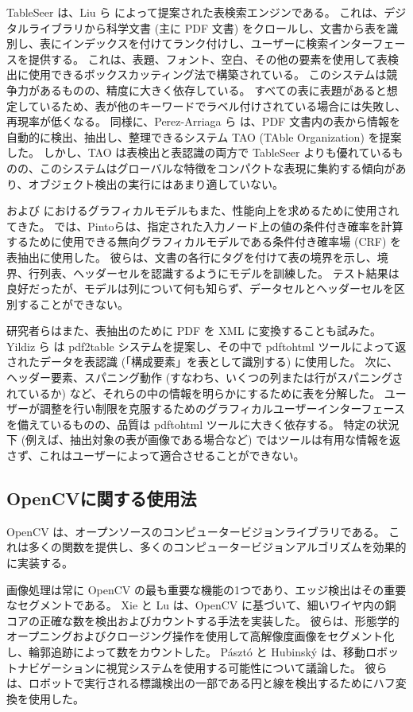 \documentclass[uplatex, twocolumn,10pt]{jsarticle}
\begin{document}
TableSeer は、Liu ら \cite{bib11} によって提案された表検索エンジンである。
これは、デジタルライブラリから科学文書 (主に PDF 文書) をクロールし、文書から表を識別し、表にインデックスを付けてランク付けし、ユーザーに検索インターフェースを提供する。
これは、表題、フォント、空白、その他の要素を使用して表検出に使用できるボックスカッティング法で構築されている。
このシステムは競争力があるものの、精度に大きく依存している。
すべての表に表題があると想定しているため、表が他のキーワードでラベル付けされている場合には失敗し、再現率が低くなる。
同様に、Perez-Arriaga ら \cite{bib12} は、PDF 文書内の表から情報を自動的に検出、抽出し、整理できるシステム TAO (TAble Organization) を提案した。
しかし、TAO は表検出と表認識の両方で TableSeer よりも優れているものの、このシステムはグローバルな特徴をコンパクトな表現に集約する傾向があり、オブジェクト検出の実行にはあまり適していない。

\cite{bib13} および \cite{bib14} におけるグラフィカルモデルもまた、性能向上を求めるために使用されてきた。
\cite{bib14} では、Pintoらは、指定された入力ノード上の値の条件付き確率を計算するために使用できる無向グラフィカルモデルである条件付き確率場 (CRF) を表抽出に使用した。
彼らは、文書の各行にタグを付けて表の境界を示し、境界、行列表、ヘッダーセルを認識するようにモデルを訓練した。
テスト結果は良好だったが、モデルは列について何も知らず、データセルとヘッダーセルを区別することができない。

研究者らはまた、表抽出のために PDF を XML に変換することも試みた。
Yildiz ら \cite{bib01} は pdf2table システムを提案し、その中で pdftohtml ツールによって返されたデータを表認識 (「構成要素」を表として識別する) に使用した。
次に、ヘッダー要素、スパニング動作 (すなわち、いくつの列または行がスパニングされているか) など、それらの中の情報を明らかにするために表を分解した。
ユーザーが調整を行い制限を克服するためのグラフィカルユーザーインターフェースを備えているものの、品質は pdftohtml ツールに大きく依存する。
特定の状況下 (例えば、抽出対象の表が画像である場合など) ではツールは有用な情報を返さず、これはユーザーによって適合させることができない。

\subsection{OpenCVに関する使用法}
OpenCV \cite{bib15} は、オープンソースのコンピュータービジョンライブラリである。
これは多くの関数を提供し、多くのコンピュータービジョンアルゴリズムを効果的に実装する。

画像処理は常に OpenCV の最も重要な機能の1つであり、エッジ検出はその重要なセグメントである。
Xie と Lu \cite{bib16} は、OpenCV に基づいて、細いワイヤ内の銅コアの正確な数を検出およびカウントする手法を実装した。
彼らは、形態学的オープニングおよびクロージング操作を使用して高解像度画像をセグメント化し、輪郭追跡によって数をカウントした。
Pásztó と Hubinský \cite{bib17} は、移動ロボットナビゲーションに視覚システムを使用する可能性について議論した。
彼らは、ロボットで実行される標識検出の一部である円と線を検出するためにハフ変換を使用した。
\end{document}
